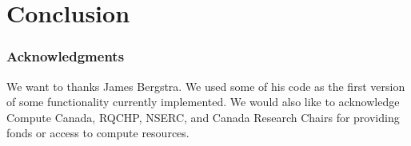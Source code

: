 \documentclass{article} %
\begin{document}
\section{Conclusion}

% 
% 


\subsubsection*{Acknowledgments}

We want to thanks James Bergstra. We used some of his code as the first version of some functionality currently implemented. We would also like to acknowledge Compute Canada, RQCHP, NSERC, and Canada Research Chairs for providing fonds or access to compute resources.




\end{document}
